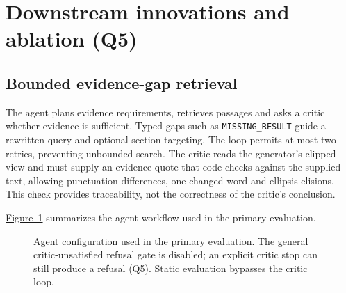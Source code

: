 \section{Downstream innovations and ablation (Q5)}
\subsection{Bounded evidence-gap retrieval}
The agent plans evidence requirements, retrieves passages and asks a critic whether evidence is sufficient. Typed gaps such as \texttt{MISSING\_RESULT} guide a rewritten query and optional section targeting. The loop permits at most two retries, preventing unbounded search. The critic reads the generator's clipped view and must supply an evidence quote that code checks against the supplied text, allowing punctuation differences, one changed word and ellipsis elisions. This check provides traceability, not the correctness of the critic's conclusion.

\hyperref[fig:system]{Figure~\ref*{fig:system}} summarizes the agent workflow used in the primary evaluation.
\begin{figure}[htbp]\centering
{}
\caption{Agent configuration used in the primary evaluation. The general critic-unsatisfied refusal gate is disabled; an explicit critic stop can still produce a refusal (Q5). Static evaluation bypasses the critic loop.}\label{fig:system}
\end{figure}

